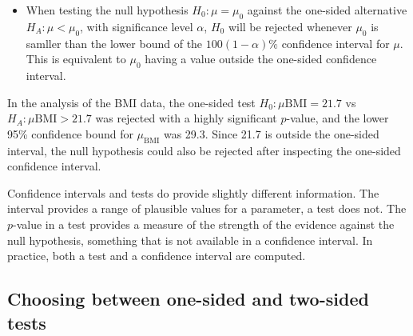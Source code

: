 \begin{spacing}{1.5}
\begin{termBox}
{{\begin{itemize}
\item When testing the null hypothesis $H_0:\mu = \mu_0$ against the one-sided alternative $H_A: \mu < \mu_0$, with significance level $\alpha$, $H_0$ will be rejected whenever $\mu_0$ is samller than the lower bound of the $100(1-\alpha)\%$ confidence interval for $\mu$. This is equivalent to $\mu_0$ having a value outside the one-sided confidence interval.
\end{itemize}
}}
\end{termBox}

\begin{example}

In the analysis of the BMI data, the one-sided test $H_0: \mu{\text{BMI}} = 21.7$ vs $H_A:\mu{\text{BMI}} > 21.7$ was rejected with a highly significant $p$-value, and the lower 95\% confidence bound for $\mu_{\text{BMI}}$ was 29.3.  Since 21.7 is outside the one-sided interval, the null hypothesis could also be rejected after inspecting the one-sided confidence interval.

Confidence intervals and tests do provide slightly different information. The interval provides a range of plausible values for a parameter, a test does not.  The $p$-value in a test provides a measure of the strength of the evidence against the null hypothesis, something that is not available in a confidence interval.  In practice, both a test and a confidence interval are computed.

\end{example}

\subsection{Choosing between one-sided and two-sided tests}

\end{spacing}

